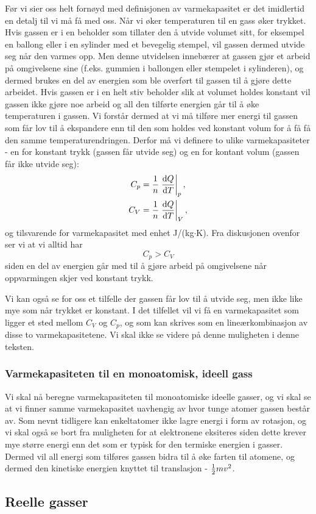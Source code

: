 Før vi sier oss helt fornøyd med definisjonen av varmekapasitet er det imidlertid en detalj til vi må få med oss. Når vi øker temperaturen til en gass øker trykket. Hvis gassen er i en beholder som tillater den å utvide volumet sitt, for eksempel en ballong eller i en sylinder med et bevegelig stempel, vil gassen dermed utvide seg når den varmes opp. Men denne utvidelsen innebærer at gassen gjør et arbeid på omgivelsene sine (f.eks. gummien i ballongen eller stempelet i sylinderen), og dermed brukes en del av energien som ble overført til gassen til å gjøre dette arbeidet. Hvis gassen er i en helt stiv beholder slik at volumet holdes konstant vil gassen ikke gjøre noe arbeid og all den tilførte energien går til å øke temperaturen i gassen. Vi forstår dermed at vi må tilføre mer energi til gassen som får lov til å ekspandere enn til den som holdes ved konstant volum for å få få den samme temperaturendringen. Derfor må vi definere to ulike varmekapasiteter - en for konstant trykk (gassen får utvide seg) og en for kontant volum (gassen får ikke utvide seg):
\begin{displaymath}
	\begin{aligned}
	C_p &= \frac{1}{n}\left.\frac{\text{d} Q}{\text{d} T}\right|_p, \\
	C_V &= \frac{1}{n}\left.\frac{\text{d} Q}{\text{d} T}\right|_V,
	\end{aligned}
\end{displaymath}
og tilsvarende for varmekapasitet med enhet J/(kg$\cdot$K). Fra diskusjonen ovenfor ser vi at vi alltid har
\begin{displaymath}
	C_p > C_V
\end{displaymath}
siden en del av energien går med til å gjøre arbeid på omgivelsene når oppvarmingen skjer ved konstant trykk.

Vi kan også se for oss et tilfelle der gassen får lov til å utvide seg, men ikke like mye som når trykket er konstant. I det tilfellet vil vi få en varmekapasitet som ligger et sted mellom $C_V$ og $C_p$, og som kan skrives som en lineærkombinasjon av disse to varmekapasitetene. Vi skal ikke se videre på denne muligheten i denne teksten.

\subsubsection{Varmekapasiteten til en monoatomisk, ideell gass}
Vi skal nå beregne varmekapasiteten til monoatomiske ideelle gasser, og vi skal se at vi finner samme varmekapasitet uavhengig av hvor tunge atomer gassen består av. Som nevnt tidligere kan enkeltatomer ikke lagre energi i form av rotasjon, og vi skal også se bort fra muligheten for at elektronene eksiteres siden dette krever mye større energi enn det som er typisk for den termiske energien i gasser. Dermed vil all energi som tilføres gassen bidra til å øke farten til atomene, og dermed den kinetiske energien knyttet til translasjon - $\frac{1}{2} mv^2$. 



\subsection{Reelle gasser}
\label{sec:kinetiskgassteori:reellgass}
